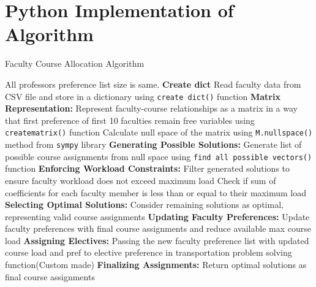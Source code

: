 \documentclass{article}
\begin{document}
\section{Python Implementation of Algorithm}
\begin{algorithm}[H]
\caption{Faculty Course Allocation Algorithm}
\label{alg:faculty_course_allocation}
\begin{algorithmic}[1]
\Ensure All professors preference list size is same.
\State \textbf{Create dict}
\State \hspace{2mm}Read faculty data from CSV file and store in a dictionary using \texttt{create dict()} function
\State \textbf{Matrix Representation:}
\State \hspace{2mm}Represent faculty-course relationships as a matrix in a way that first preference of first 10 faculties remain free variables using \texttt{creatematrix()} function
\State \hspace{2mm}Calculate null space of the matrix using \texttt{M.nullspace()} method from \texttt{sympy} library
\State \textbf{Generating Possible Solutions:}
\State \hspace{2mm}Generate list of possible course assignments from null space using \texttt{find all possible vectors()} function
\State \textbf{Enforcing Workload Constraints:}
\State \hspace{2mm}Filter generated solutions to ensure faculty workload does not exceed maximum load
\State \hspace{2mm}Check if sum of coefficients for each faculty member is less than or equal to their maximum load
\State \textbf{Selecting Optimal Solutions:}
\State \hspace{2mm}Consider remaining solutions as optimal, representing valid course assignments
\State \textbf{Updating Faculty Preferences:}
\State \hspace{2mm}Update faculty preferences with final course assignments and reduce available max course load
\State \textbf{Assigning Electives:}
\State \hspace{2mm}Passing the new faculty preference list with updated course load and pref to elective preference in transportation problem solving function(Custom made)
\State \textbf{Finalizing Assignments:}
\State \hspace{2mm}Return optimal solutions as final course assignments
\end{algorithmic}
\end{algorithm}
\end{document}
